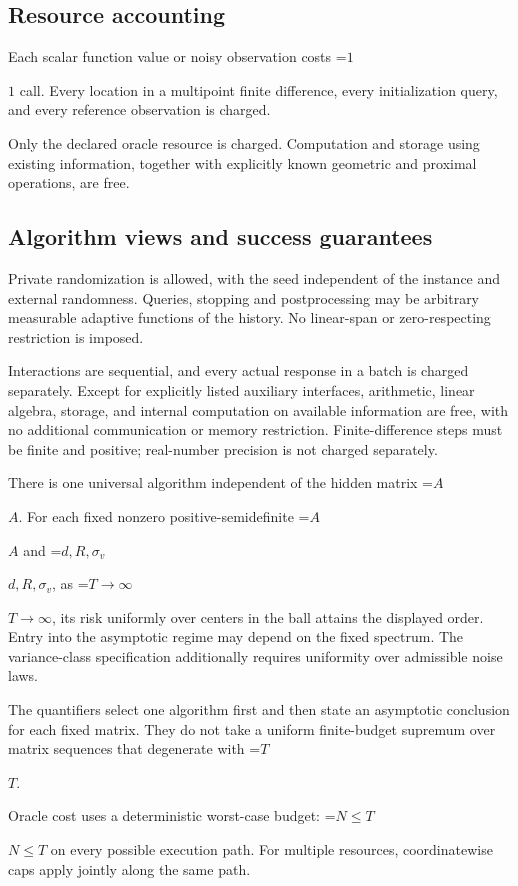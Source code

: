 \documentclass[10pt,a4paper]{article}
\newcommand{\AtlasMath}[1]{\par\begingroup\centering\setbox0=\hbox{$\displaystyle #1$}\ifdim\wd0>1.4\linewidth\typeout{ATLAS WIDE FORMULA: \the\wd0}\fi\ifdim\wd0>\linewidth\resizebox{\linewidth}{!}{\box0}\else\box0\fi\par\endgroup}
\newcommand{\AtlasInlineMath}[1]{\begingroup\setbox0=\hbox{$#1$}\ifdim\wd0>.4\linewidth\endgroup\AtlasMath{#1}\else\endgroup$#1$\fi}
\begin{document}
\subsection{Resource accounting}
Each scalar function value or noisy observation costs \AtlasInlineMath{1} call. Every location in a multipoint finite difference, every initialization query, and every reference observation is charged.

Only the declared oracle resource is charged. Computation and storage using existing information, together with explicitly known geometric and proximal operations, are free.

\subsection{Algorithm views and success guarantees}
Private randomization is allowed, with the seed independent of the instance and external randomness. Queries, stopping and postprocessing may be arbitrary measurable adaptive functions of the history. No linear-span or zero-respecting restriction is imposed.

Interactions are sequential, and every actual response in a batch is charged separately. Except for explicitly listed auxiliary interfaces, arithmetic, linear algebra, storage, and internal computation on available information are free, with no additional communication or memory restriction. Finite-difference steps must be finite and positive; real-number precision is not charged separately.

There is one universal algorithm independent of the hidden matrix \AtlasInlineMath{A}. For each fixed nonzero positive-semidefinite \AtlasInlineMath{A} and \AtlasInlineMath{d,R,\sigma_v}, as \AtlasInlineMath{T\to\infty}, its risk uniformly over centers in the ball attains the displayed order. Entry into the asymptotic regime may depend on the fixed spectrum. The variance-class specification additionally requires uniformity over admissible noise laws.

The quantifiers select one algorithm first and then state an asymptotic conclusion for each fixed matrix. They do not take a uniform finite-budget supremum over matrix sequences that degenerate with \AtlasInlineMath{T}.

Oracle cost uses a deterministic worst-case budget: \AtlasInlineMath{N\le T} on every possible execution path. For multiple resources, coordinatewise caps apply jointly along the same path.
\end{document}
